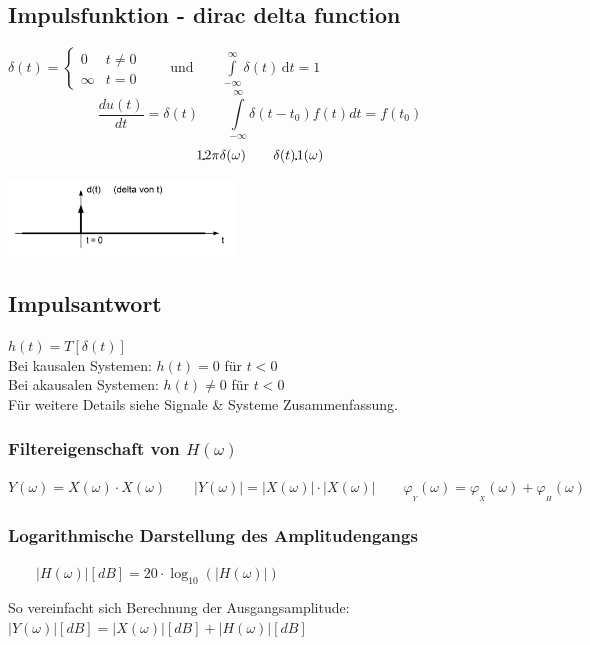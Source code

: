 \subsection{Impulsfunktion - dirac delta function}
	\begin{minipage}{10cm}
		$\delta (t)=\begin{cases} 0 & t\ne 0\\\infty & t=0\end{cases} \qquad
		\text{und} \qquad \int\limits_{-\infty}^\infty \delta(t) \, \mathrm dt = 1 $\\
		\[
			\frac{du(t)}{dt}=\delta(t) \qquad
			\int\limits_{-\infty}^{\infty}\delta(t-t_0)f(t)dt=f(t_0)
		\]
		\[
			1 \FT 2\pi \delta(\omega) \qquad \delta(t) \FT 1(\omega)
		\]
		 
	\end{minipage}
	\begin{minipage}{8cm}
		\includegraphics[width=6cm]{bilder/diracimpulse.png}
	\end{minipage}


	\subsection{Impulsantwort }
		$h(t) = T[\delta(t)] \qquad $\\
		Bei kausalen Systemen: $h(t) = 0$ für $t < 0$ \\   
		Bei akausalen Systemen: $h(t) \neq 0$ für $t < 0$\\ 
		Für weitere Details siehe Signale \& Systeme Zusammenfassung.
		\subsubsection{Filtereigenschaft von $H(\omega)$}
			$ Y(\omega) = X(\omega) \cdot X(\omega)
				\qquad |Y(\omega)| = |X(\omega)| \cdot |X(\omega)|
				\qquad \varphi_{_Y}(\omega) = \varphi_{_X}(\omega) + \varphi_{_H}(\omega)$
		
		\subsubsection{Logarithmische Darstellung des Amplitudengangs}
			$ \qquad |H(\omega)| [dB] = 20 \cdot \log_{10}(|H(\omega)|)\qquad$
			\parbox{10cm}{So vereinfacht sich Berechnung der 
				Ausgangsamplitude:\\
				\hspace*{0.5cm}$ |Y(\omega)| [dB] = |X(\omega)|[dB] + |H(\omega)| [dB]$
			}

